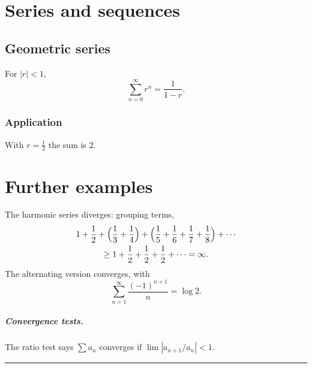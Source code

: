 \documentclass[12pt,letterpaper]{article}
\begin{document}
\section{Series and sequences}
\subsection{Geometric series}
For $|r|<1$,
\[
\sum_{n=0}^\infty r^n=\frac1{1-r}.
\]
\subsubsection{Application}
With $r=\tfrac12$ the sum is $2$.

\newpage
\section{Further examples}
\thispagestyle{empty}
The harmonic series diverges: grouping terms,
\begin{multline*}
1+\frac12+\Bigl(\frac13+\frac14\Bigr)+\Bigl(\frac15+\frac16+\frac17+\frac18\Bigr)+\cdots\\
\ge 1+\frac12+\frac12+\frac12+\cdots=\infty.
\end{multline*}
\medskip
The alternating version converges, with
\begin{displaymath}
\sum_{n=1}^\infty\frac{(-1)^{n+1}}n=\log 2.
\end{displaymath}
\bigskip
\subparagraph{Convergence tests.} The ratio test says $\sum a_n$ converges if $\lim|a_{n+1}/a_n|<1$.
\vfill
\begin{center}
\rule{4cm}{0.4pt}
\end{center}
\end{document}
